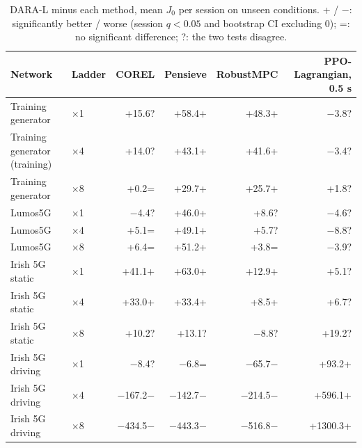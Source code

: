 \begin{table}[t]\centering\footnotesize
\caption{DARA-L minus each method, mean $J_0$ per session on unseen conditions. + / $-$: significantly better / worse (session $q<0.05$ and bootstrap CI excluding 0); =: no significant difference; ?: the two tests disagree.}
\label{tab:generalisation}
\begin{tabular}{llrrrr}\toprule
Network & Ladder & COREL & Pensieve & RobustMPC & PPO-Lagrangian, 0.5 s \\\midrule
Training generator & $\times$1 & +15.6? & +58.4+ & +48.3+ & $-$3.8? \\
Training generator (training) & $\times$4 & +14.0? & +43.1+ & +41.6+ & $-$3.4? \\
Training generator & $\times$8 & +0.2= & +29.7+ & +25.7+ & +1.8? \\
Lumos5G & $\times$1 & $-$4.4? & +46.0+ & +8.6? & $-$4.6? \\
Lumos5G & $\times$4 & +5.1= & +49.1+ & +5.7? & $-$8.8? \\
Lumos5G & $\times$8 & +6.4= & +51.2+ & +3.8= & $-$3.9? \\
Irish 5G static & $\times$1 & +41.1+ & +63.0+ & +12.9+ & +5.1? \\
Irish 5G static & $\times$4 & +33.0+ & +33.4+ & +8.5+ & +6.7? \\
Irish 5G static & $\times$8 & +10.2? & +13.1? & $-$8.8? & +19.2? \\
Irish 5G driving & $\times$1 & $-$8.4? & $-$6.8= & $-$65.7$-$ & +93.2+ \\
Irish 5G driving & $\times$4 & $-$167.2$-$ & $-$142.7$-$ & $-$214.5$-$ & +596.1+ \\
Irish 5G driving & $\times$8 & $-$434.5$-$ & $-$443.3$-$ & $-$516.8$-$ & +1300.3+ \\
\bottomrule\end{tabular}
\end{table}
